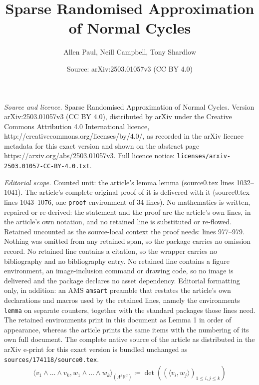 \documentclass[10pt,a4paper]{amsart}
\title{Sparse Randomised Approximation of Normal Cycles}
\author{Allen Paul, Neill Campbell, Tony Shardlow}
\date{Source: arXiv:2503.01057v3 (CC BY 4.0)}
\newtheorem{lemma}{Lemma}
\newcommand{\R}{\ensuremath{\mathbb{R}}}%
\begin{document}
\maketitle

\noindent\emph{Source and licence.} Sparse Randomised Approximation of Normal Cycles. Version arXiv:2503.01057v3 (CC BY 4.0), distributed by arXiv under the Creative Commons Attribution 4.0 International licence, http://creativecommons.org/licenses/by/4.0/, as recorded in the arXiv licence metadata for this exact version and shown on the abstract page https://arxiv.org/abs/2503.01057v3. Full licence notice: \texttt{licenses/arxiv-2503.01057-CC-BY-4.0.txt}.\par\smallskip

\noindent\textit{Editorial scope.} Counted unit: the article's lemma lemma (source0.tex lines 1032--1041). The article's complete original proof of it is delivered with it (source0.tex lines 1043--1076, one \texttt{proof} environment of 34 lines). No mathematics is written, repaired or re-derived: the statement and the proof are the article's own lines, in the article's own notation, and no retained line is substituted or re-flowed.  Retained uncounted as the source-local context the proof needs: lines 977--979.  Nothing was omitted from any retained span, so the package carries no omission record.  No retained line contains a citation, so the wrapper carries no bibliography and no bibliography entry.  No retained line contains a figure environment, an image-inclusion command or drawing code, so no image is delivered and the package declares no asset dependency.  Editorial formatting only, in addition: an AMS \texttt{amsart} preamble that restates the article's own declarations and macros used by the retained lines, namely the environments \texttt{lemma} on separate counters, together with the standard packages those lines need.  The retained environments print in this document as Lemma 1 in order of appearance, whereas the article prints the same items with the numbering of its own full document.  The complete native source of the article as distributed in the arXiv e-print for this exact version is bundled unchanged as \texttt{sources/174118/source0.tex}.
\begin{align}\label{exteriorinnerproddef}
    \langle v_{1}\wedge \dots \wedge v_{k},w_{1}\wedge \dots \wedge w_{k}\rangle_{(\Lambda^{k}\R^{d}) } \coloneq \det((\langle v_{i} ,w_{j}\rangle)_{1\leq i,j\leq k})
\end{align}

\end{document}
